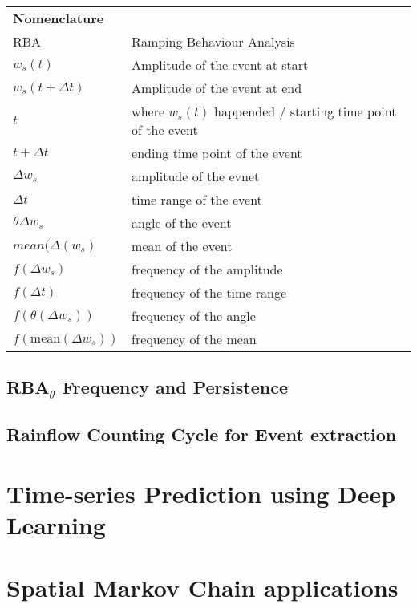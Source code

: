 \documentclass[11pt]{article}
\begin{document}
\begin{table}[h]
\centering
\begin{tabular}{ll}
\bfseries Nomenclature & \\
RBA &	Ramping Behaviour Analysis \\
$w_s(t)$ &  Amplitude of the event at start \\
$w_s (t+\Delta t)$ &  Amplitude of the event at end \\
$t$ & where $w_s(t)$  happended / starting time point of the event \\
$t+\Delta t$ &  ending time point of the event \\
$\Delta w_s$ &  amplitude of the evnet \\
$ \Delta t$ &  time range of the event \\
$\theta \Delta w_s$ &  angle of the event \\
$\textit{mean}( \Delta (w_s)$&  mean of the event \\
$f( \Delta w_s)$&  frequency of the amplitude \\
$f( \Delta t)$&  frequency of the time range \\
$f(\theta (\Delta w_s))$&  frequency of the angle \\
$f(\text{mean}( \Delta w_s))$&  frequency of the mean
\end{tabular}
\end{table}








\subsection{RBA$_\theta$ Frequency and Persistence} \label{ss:persistence}


\subsection{Rainflow Counting Cycle for Event extraction} \label{ssec:rainflow}


\section{Time-series Prediction using Deep Learning }
\label{ssec:lstm}



\section{Spatial Markov Chain applications} \label{sec:markov}

\end{document}
